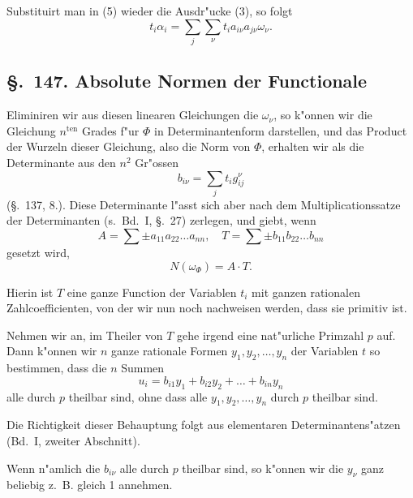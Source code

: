 \documentclass[12pt,a4paper]{article}
\theoremstyle{definition}
\begin{document}
Substituirt man in (5) wieder die Ausdr"ucke (3), so folgt
\begin{equation}
t_i \alpha_i = \sum_j \sum_\nu t_i a_{i\nu} a_{j\nu} \omega_\nu.
\end{equation}

\subsection*{\S.~147. Absolute Normen der Functionale}

Eliminiren wir aus diesen linearen Gleichungen die $\omega_\nu$, so k"onnen wir die Gleichung $n^{\text{ten}}$ Grades f"ur $\Phi$ in Determinantenform darstellen, und das Product der Wurzeln dieser Gleichung, also die Norm von $\Phi$, erhalten wir als die Determinante aus den $n^2$ Gr"ossen
\begin{equation}
b_{i\nu} = \sum_j t_i g_{ij}^\nu
\end{equation}
(\S.~137, 8.). Diese Determinante l"asst sich aber nach dem Multiplicationssatze der Determinanten (s.~Bd.~I, \S.~27) zerlegen, und giebt, wenn
\begin{equation}
A = \sum \pm a_{11} a_{22} \dots a_{nn}, \quad T = \sum \pm b_{11} b_{22} \dots b_{nn}
\end{equation}
gesetzt wird,
\begin{equation}
N(\omega_\Phi) = A \cdot T.
\end{equation}

Hierin ist $T$ eine ganze Function der Variablen $t_i$ mit ganzen rationalen Zahlcoefficienten, von der wir nun noch nachweisen werden, dass sie primitiv ist.

Nehmen wir an, im Theiler von $T$ gehe irgend eine nat"urliche Primzahl $p$ auf. Dann k"onnen wir $n$ ganze rationale Formen $y_1, y_2, \dots, y_n$ der Variablen $t$ so bestimmen, dass die $n$ Summen
\begin{equation}
u_{i} = b_{i1} y_1 + b_{i2} y_2 + \dots + b_{in} y_n\end{equation}
alle durch $p$ theilbar sind, ohne dass alle $y_1, y_2, \dots, y_n$ durch $p$ theilbar sind.

Die Richtigkeit dieser Behauptung folgt aus elementaren Determinantens"atzen (Bd.~I, zweiter Abschnitt).

Wenn n"amlich die $b_{i\nu}$ alle durch $p$ theilbar sind, so k"onnen wir die $y_\nu$ ganz beliebig z.~B. gleich 1 annehmen.
\end{document}
